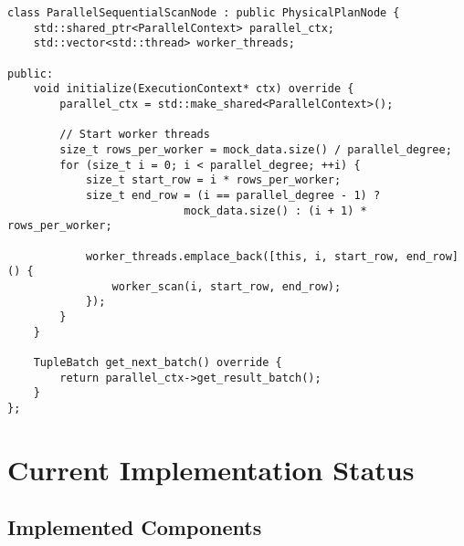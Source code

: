 \documentclass[12pt,a4paper]{article}
\begin{document}
\begin{lstlisting}[style=cpp, caption=Parallel Execution Implementation]
class ParallelSequentialScanNode : public PhysicalPlanNode {
    std::shared_ptr<ParallelContext> parallel_ctx;
    std::vector<std::thread> worker_threads;
    
public:
    void initialize(ExecutionContext* ctx) override {
        parallel_ctx = std::make_shared<ParallelContext>();
        
        // Start worker threads
        size_t rows_per_worker = mock_data.size() / parallel_degree;
        for (size_t i = 0; i < parallel_degree; ++i) {
            size_t start_row = i * rows_per_worker;
            size_t end_row = (i == parallel_degree - 1) ? 
                           mock_data.size() : (i + 1) * rows_per_worker;
            
            worker_threads.emplace_back([this, i, start_row, end_row]() {
                worker_scan(i, start_row, end_row);
            });
        }
    }
    
    TupleBatch get_next_batch() override {
        return parallel_ctx->get_result_batch();
    }
};
\end{lstlisting}

\section{Current Implementation Status}

\subsection{Implemented Components}
\end{document}
